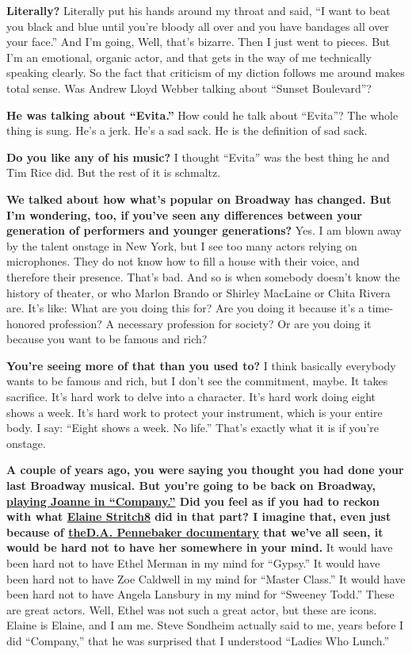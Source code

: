 \textbf{Literally?} Literally put his hands around my throat and said,
``I want to beat you black and blue until you're bloody all over and you
have bandages all over your face.'' And I'm going, Well, that's bizarre.
Then I just went to pieces. But I'm an emotional, organic actor, and
that gets in the way of me technically speaking clearly. So the fact
that criticism of my diction follows me around makes total sense. Was
Andrew Lloyd Webber talking about ``Sunset Boulevard''?

\textbf{He was talking about ``Evita.''} How could he talk about
``Evita''? The whole thing is sung. He's a jerk. He's a sad sack. He is
the definition of sad sack.

\textbf{Do you like any of his music?} I thought ``Evita'' was the best
thing he and Tim Rice did. But the rest of it is schmaltz.

\textbf{We talked about how what's popular on Broadway has changed. But
I'm wondering, too, if you've seen any differences between your
generation of performers and younger generations?} Yes. I am blown away
by the talent onstage in New York, but I see too many actors relying on
microphones. They do not know how to fill a house with their voice, and
therefore their presence. That's bad. And so is when somebody doesn't
know the history of theater, or who Marlon Brando or Shirley MacLaine or
Chita Rivera are. It's like: What are you doing this for? Are you doing
it because it's a time-honored profession? A necessary profession for
society? Or are you doing it because you want to be famous and rich?

\textbf{You're seeing more of that than you used to?} I think basically
everybody wants to be famous and rich, but I don't see the commitment,
maybe. It takes sacrifice. It's hard work to delve into a character.
It's hard work doing eight shows a week. It's hard work to protect your
instrument, which is your entire body. I say: ``Eight shows a week. No
life.'' That's exactly what it is if you're onstage.

\textbf{A couple of years ago, you were saying you thought you had done
your last Broadway musical. But you're going to be back on Broadway,
\href{https://www.nytimes3xbfgragh.onion/2019/08/30/theater/broadway-company-sondheim-elliott-katrina-lenk-patti-lupone.html}{playing
Joanne in ``Company.''} Did you feel as if you had to reckon with what
\href{http://nytimes3xbfgragh.onion\#tooltip-8}{Elaine Stritch8} did in
that part? I imagine that, even just because of
\href{https://phfilms.com/films/company-original-cast-album/}{the}\href{https://phfilms.com/films/company-original-cast-album/}{D.A.
Pennebaker documentary} that we've all seen, it would be hard not to
have her somewhere in your mind.} It would have been hard not to have
Ethel Merman in my mind for ``Gypsy.'' It would have been hard not to
have Zoe Caldwell in my mind for ``Master Class.'' It would have been
hard not to have Angela Lansbury in my mind for ``Sweeney Todd.'' These
are great actors. Well, Ethel was not such a great actor, but these are
icons. Elaine is Elaine, and I am me. Steve Sondheim actually said to
me, years before I did ``Company,'' that he was surprised that I
understood ``Ladies Who Lunch.''

